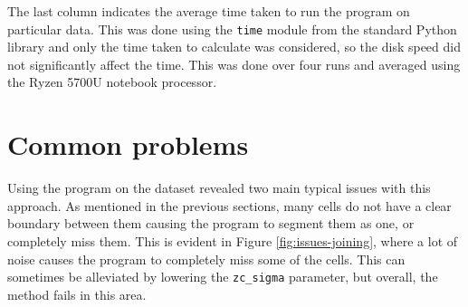\documentclass[
  digital,     %
  oneside,     %
  nosansbold,  %
  nocolorbold, %
  lof,         %
  lot,         %
]{fithesis4}
\begin{document}
The last column indicates the average time taken to run the program on
particular data. This was done using the \texttt{time} module from the standard
Python library and only the time taken to calculate was considered,
so the disk speed did not significantly affect the time. This was done over
four runs and averaged using the Ryzen 5700U notebook processor.

\section{Common problems}

Using the program on the dataset revealed two main typical issues with this
approach. As mentioned in the previous sections, many cells do not have a clear boundary
between them causing the program to segment them as one, or completely miss them.
This is evident in Figure \ref{fig:issues-joining}, where a lot of noise
causes the program to completely miss some of the cells. This can sometimes be
alleviated by lowering the \texttt{zc\_sigma} parameter, but overall, the method
fails in this area.
\end{document}
